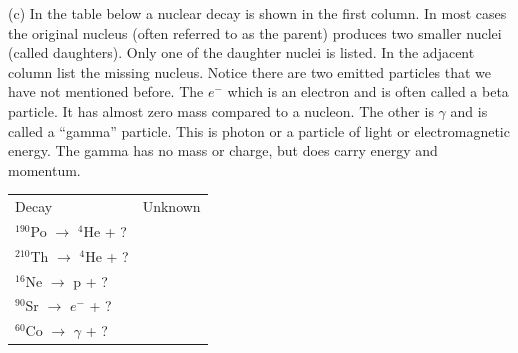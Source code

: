 (c) In the table below a nuclear decay is shown in the first column.
In most cases the original nucleus (often referred to as the parent)
produces two smaller nuclei (called daughters). Only one of the
daughter nuclei is listed. In the adjacent column list the missing
nucleus.
Notice there are two emitted particles that we have not mentioned
before.
The $e^-$ which is an electron and is often called a
beta particle.
It has almost zero mass compared to a nucleon.
The other is $\gamma$ and is called a ``gamma'' particle.
This is photon or a particle of light
or electromagnetic energy.
The gamma has no mass or charge, but does carry energy and momentum.

\vspace{0.3cm}
{\renewcommand{\arraystretch}{1.2}
{\centering \begin{tabular}{|C{1.5in}|C{1.5in}|}
\hline 
Decay & Unknown \\
\hhline{|=|=|}
\( ^{190} \)Po \( \rightarrow  \) \( ^{4} \)He + ?&
\\
\hline 
\( ^{210} \)Th \( \rightarrow  \) \( ^{4} \)He + ?&
\\
\hline 
\( ^{16} \)Ne \( \rightarrow  \) p + ?&
\\
\hline 
\( ^{90} \)Sr \( \rightarrow  \) \(e^-\) + ?&
\\
\hline 
\( ^{60} \)Co \( \rightarrow  \) \(\gamma\) + ?&
\\
\hline
\end{tabular}\par}}
\vspace{0.3cm}



